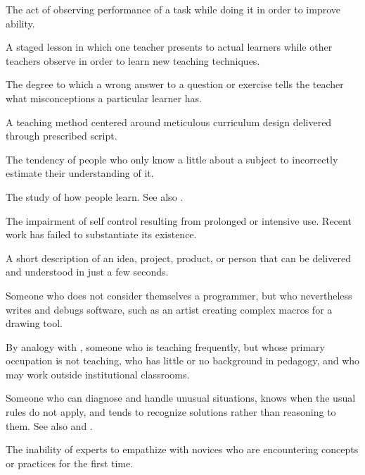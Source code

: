 \begin{description}
 The act of observing
performance of a task while doing it in order to improve ability.

 A staged lesson in which
one teacher presents to actual learners while other teachers observe in order to
learn new teaching techniques.

 The degree to which a wrong answer
to a question or exercise tells the teacher what misconceptions a particular
learner has.

 A teaching method centered
around meticulous curriculum design delivered through prescribed script.

 The tendency of people
who only know a little about a subject to incorrectly estimate their
understanding of it.

 The study of how
people learn. See also .

 The impairment of self control resulting
from prolonged or intensive use.  Recent work has failed to substantiate its
existence.

 A short description of an idea,
project, product, or person that can be delivered and understood in just a few
seconds.

 Someone who does not
consider themselves a programmer, but who nevertheless writes and debugs
software, such as an artist creating complex macros for a drawing tool.

 By analogy with
,
someone who is teaching frequently, but whose primary occupation is not
teaching, who has little or no background in pedagogy, and who may work outside
institutional classrooms.

 Someone who can diagnose and handle unusual
situations, knows when the usual rules do not apply, and tends to recognize
solutions rather than reasoning to them. See
also 
and .

 The inability of experts to
empathize with novices who are encountering concepts or practices for the first
time.


\end{description}
